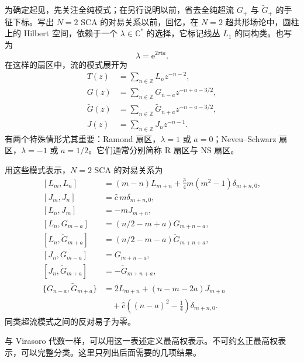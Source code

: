 为确定起见，先关注全纯模式；在另行说明以前，省去全纯超流 $G_+$ 与 $\widetilde G_+$ 的手征下标。写出 $N=2$ SCA 的对易关系以前，回忆，在 $N=2$ 超共形场论中，圆柱上的 Hilbert 空间，依赖于一个 $\lambda\in\mathbb{C}^*$ 的选择，它标记线丛 $L_1$ 的同构类。也写为
\begin{equation}\label{eq:3.90}
\lambda=\mathrm{e}^{2\pi\mathrm{i}a}.
\end{equation}
在这样的扇区中，流的模式展开为
\[
\begin{aligned}
T(z)&=\sum_{n\in\mathbb{Z}}L_nz^{-n-2},\\
G(z)&=\sum_{n\in\mathbb{Z}}G_{n-a}z^{-n+a-3/2},\\
\widetilde G(z)&=\sum_{n\in\mathbb{Z}}\widetilde G_{n+a}z^{-n-a-3/2},\\
J(z)&=\sum_{n\in\mathbb{Z}}J_nz^{-n-1}.
\end{aligned}
\]
有两个特殊情形尤其重要：Ramond 扇区，$\lambda=1$ 或 $a=0$；Neveu--Schwarz 扇区，$\lambda=-1$ 或 $a=1/2$。它们通常分别简称 R 扇区与 NS 扇区。

\begin{definition*}\label{def:3.n2-superconformal-algebra}
用这些模式表示，$N=2$ SCA 的对易关系为
\begin{equation}\label{eq:3.91}
\begin{aligned}
[L_m,L_n]&=(m-n)L_{m+n}
+\frac{\widehat c}{4}m(m^2-1)\delta_{m+n,0},\\
[J_m,J_n]&=\widehat c\,m\delta_{m+n,0},\\
[L_n,J_m]&=-mJ_{m+n},\\
[L_n,G_{m-a}]&=(n/2-m+a)G_{m+n-a},\\
[L_n,\widetilde G_{m+a}]&=(n/2-m-a)\widetilde G_{m+n+a},\\
[J_n,G_{m-a}]&=G_{m+n-a},\\
[J_n,\widetilde G_{m+a}]&=-\widetilde G_{m+n+a},\\
\{G_{n-a},\widetilde G_{m+a}\}
&=2L_{m+n}+(n-m-2a)J_{m+n}\\
&\quad+\widehat c\left((n-a)^2-\tfrac14\right)\delta_{m+n,0}.
\end{aligned}
\end{equation}
同类超流模式之间的反对易子为零。
\end{definition*}

与 Virasoro 代数一样，可以用这一表述定义最高权表示。不可约幺正最高权表示，可以完整分类。这里只列出后面需要的几项结果。

